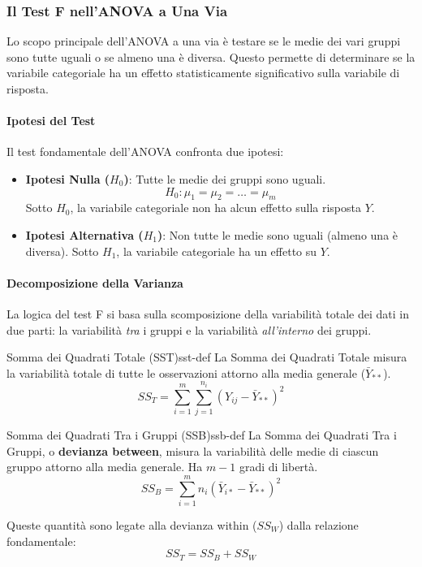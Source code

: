 \subsubsection{Il Test F nell'ANOVA a Una Via}
Lo scopo principale dell'ANOVA a una via è testare se le medie dei vari gruppi sono tutte uguali o se almeno una è diversa. Questo permette di determinare se la variabile categoriale ha un effetto statisticamente significativo sulla variabile di risposta.

\paragraph{Ipotesi del Test}
Il test fondamentale dell'ANOVA confronta due ipotesi:
\begin{itemize}
    \item \textbf{Ipotesi Nulla (\(H_0\))}: Tutte le medie dei gruppi sono uguali.
    \[ H_0: \mu_1 = \mu_2 = \dots = \mu_m \]
    Sotto \(H_0\), la variabile categoriale non ha alcun effetto sulla risposta \(Y\).
    \item \textbf{Ipotesi Alternativa (\(H_1\))}: Non tutte le medie sono uguali (almeno una è diversa). Sotto \(H_1\), la variabile categoriale ha un effetto su \(Y\).
\end{itemize}

\paragraph{Decomposizione della Varianza}
La logica del test F si basa sulla scomposizione della variabilità totale dei dati in due parti: la variabilità \textit{tra} i gruppi e la variabilità \textit{all'interno} dei gruppi.

\begin{definizione}{Somma dei Quadrati Totale (SST)}{sst-def}
La Somma dei Quadrati Totale misura la variabilità totale di tutte le osservazioni attorno alla media generale (\(\bar{Y}_{**}\)).
\[SS_T = \sum_{i=1}^{m}\sum_{j=1}^{n_i} (Y_{ij} - \bar{Y}_{**})^2\]
\end{definizione}

\begin{definizione}{Somma dei Quadrati Tra i Gruppi (SSB)}{ssb-def}
La Somma dei Quadrati Tra i Gruppi, o \textbf{devianza between}, misura la variabilità delle medie di ciascun gruppo attorno alla media generale. Ha \(m-1\) gradi di libertà.
\[ SS_B = \sum_{i=1}^{m} n_i (\bar{Y}_{i*} - \bar{Y}_{**})^2 \]
\end{definizione}
Queste quantità sono legate alla devianza within (\(SS_W\)) dalla relazione
fondamentale:
\[
    SS_T = SS_B + SS_W
\]

